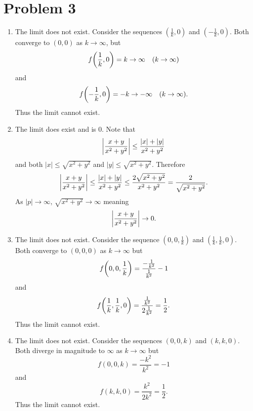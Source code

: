 \documentclass{eeleyes}
\begin{document}
\section*{Problem 3}
\begin{enumerate}[label=\alph*)]
    \item 
        The limit does not exist. Consider the sequences $(\frac{1}{k}, 0)$ and $(-\frac{1}{k}, 0)$. Both converge to $(0,0)$ as $k \to \infty$, but
        \[
            f\qty(\frac{1}{k}, 0) = k \to \infty \quad (k \to \infty)
        \]
        and
        \[
            f\qty(-\frac{1}{k}, 0) = -k \to -\infty \quad (k \to \infty)
        .\]
        Thus the limit cannot exist.
    \item 
        The limit does exist and is $0$. Note that
        \[
            \qty|\frac{x+y}{x^2 + y^2}| \leq \frac{|x| + |y|}{x^2 + y^2}
        \]
        and both $|x| \leq \sqrt{x^2 + y^2}$ and $|y| \leq \sqrt{x^2 + y^2}$. Therefore
        \[
            \qty|\frac{x+y}{x^2 + y^2}| \leq \frac{|x| + |y|}{x^2 + y^2} \leq \frac{2 \sqrt{x^2 + y^2}}{x^2 + y^2} = \frac{2}{\sqrt{x^2 + y^2}}
        .\]
        As $|p| \to \infty$, $\sqrt{x^2 + y^2} \to \infty$ meaning
        \[
            \qty|\frac{x+y}{x^2 + y^2}| \to 0
        .\]
    \item The limit does not exist. Consider the sequence $(0, 0, \frac{1}{k})$ and $(\frac{1}{k}, \frac{1}{k}, 0)$. Both converge to $(0,0,0)$ as $k \to \infty$ but
        \[
            f\qty(0,0, \frac{1}{k}) = \frac{-\frac{1}{k^2}}{\frac{1}{k^2}} -1
        \]
        and
        \[
            f\qty(\frac{1}{k}, \frac{1}{k}, 0) = \frac{\frac{1}{k^2}}{2 \frac{1}{k^2}} = \frac{1}{2}
        .\]
        Thus the limit cannot exist.
    \item The limit does not exist. Consider the sequences $(0, 0, k)$ and $(k,k,0)$. Both diverge in magnitude to $\infty$ as $k \to \infty$ but
        \[
            f(0,0,k) = \frac{-k^2}{k^2} = -1
        \]
        and
        \[
            f(k,k,0) = \frac{k^2}{2k^2} = \frac{1}{2}
        .\]
        Thus the limit cannot exist.
\end{enumerate}
\end{document}
